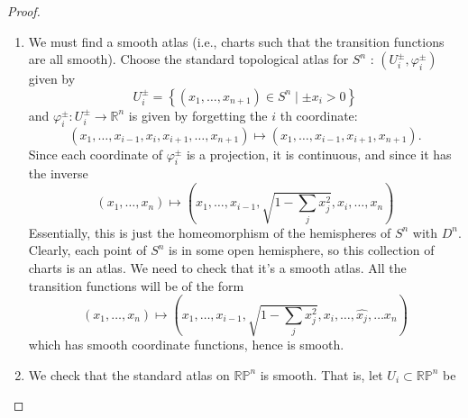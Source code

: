 \documentclass[reqno]{amsart}
\theoremstyle{definition}
\theoremstyle{remark}
\begin{document}
    \begin{proof}
        \begin{enumerate}
            \item We must find a smooth atlas (i.e., 
                charts such that the transition functions
                are all smooth).
                Choose the standard topological atlas for
                $S^{n}$ : 
                $\left( U_{i}^{\pm},
                \varphi_i^{\pm} \right) $ 
                given by
                \[
                U_i^{\pm} = 
                \left\{ \left( x_1,\ldots,
                x_{n+1} \right) \in S^{n}  \mid 
            \pm x_i > 0 \right\} 
                \] 
                and
                $\varphi_{i}^{\pm} \colon
                U_{i}^{\pm} \to \mathbb{R}^{n}$ is given by
                forgetting the $i$ th coordinate:
                \[
                    \left( x_1, \ldots, x_{i-1},
                    x_{i}, x_{i+1} , \ldots, x_{n+1}\right) 
                    \mapsto 
                    \left( x_1, \ldots, x_{i-1}, x_{i+1},
                    x_{n+1}\right) .
                \] 
                Since each coordinate of
                $\varphi_{i}^{\pm}$ is
                a projection, it is continuous, and
                since it has the inverse
                \[
                    \left( x_1, \ldots, x_{n} \right) 
                    \mapsto 
                    \left( x_1, \ldots, x_{i-1},
                    \sqrt{1 - \sum_j x_j^2} ,
                 x_i, \ldots, x_n \right) 
                \] 
                Essentially, this is just the homeomorphism
                of the hemispheres of
                $S^{n}$ with $D^{n}$. Clearly, each
                point of $S^{n}$ is in some open hemisphere,
                so this collection of charts
                is an atlas. We need to check that
                it's a smooth atlas. 
                All the transition functions will
                be of the form
                \[
                    \left( x_1, \ldots, x_n \right) 
                    \mapsto 
                    \left( x_1, \ldots,
                    x_{i-1}, 
                \sqrt{1 - \sum_j x_j^2} , x_i,
            \ldots, \hat{x_j}, \ldots x_n \right) 
                \] 
                which has smooth coordinate functions, hence
                is smooth.
            \item We check that the standard atlas
                on $\mathbb{R}\mathbb{P}^{n}$ is smooth.
                That is, let
                $U_i \subset \mathbb{R}\mathbb{P}^{n}$ be

\end{enumerate}
\end{proof}
\end{document}
